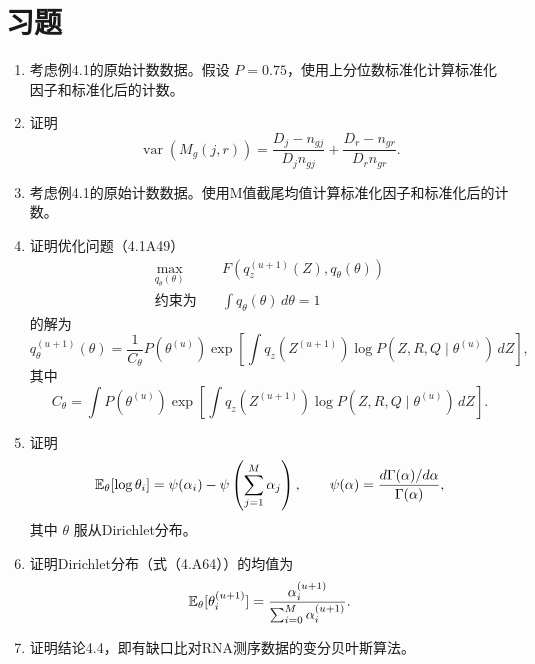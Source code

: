 \clearpage
\section*{习题}

\begin{enumerate}[label=\textbf{习题\arabic*.},leftmargin=5em]
\item 考虑例4.1的原始计数数据。假设 $P=0.75$，使用上分位数标准化计算标准化因子和标准化后的计数。

\item 证明
\[
\operatorname{var}(M_g(j,r))=\frac{D_j-n_{gj}}{D_jn_{gj}}+
\frac{D_r-n_{gr}}{D_rn_{gr}}.
\]
\item 考虑例4.1的原始计数数据。使用M值截尾均值计算标准化因子和标准化后的计数。

\item 证明优化问题（4.1A49）
\[
\begin{aligned}
\max_{q_\theta(\theta)}\quad&F(q_z^{(u+1)}(Z),q_\theta(\theta))\\
\text{约束为}\quad&\int q_\theta(\theta)\,d\theta=1
\end{aligned}
\]
的解为
\[
q_\theta^{(u+1)}(\theta)=\frac1{C_\theta}P(\theta^{(u)})
\exp\left[\int q_z(Z^{(u+1)})\log P(Z,R,Q\mid\theta^{(u)})\,dZ\right],
\]
其中
\[
C_\theta=\int P(\theta^{(u)})\exp\left[
\int q_z(Z^{(u+1)})\log P(Z,R,Q\mid\theta^{(u)})\,dZ\right].
\]
\item 证明
\[
\mathbb{E}_\theta[\log\theta_i]=\psi(\alpha_i)-\psi\left(\sum_{j=1}^{M}\alpha_j\right),
\qquad\psi(\alpha)=\frac{d\Gamma(\alpha)/d\alpha}{\Gamma(\alpha)},
\]
其中 $\theta$ 服从Dirichlet分布。

\item 证明Dirichlet分布（式（4.A64））的均值为
\[
\mathbb{E}_\theta[\theta_i^{(u+1)}]=\frac{\alpha_i^{(u+1)}}{\sum_{i=0}^{M}\alpha_i^{(u+1)}}.
\]
\item 证明结论4.4，即有缺口比对RNA测序数据的变分贝叶斯算法。


\end{enumerate}
